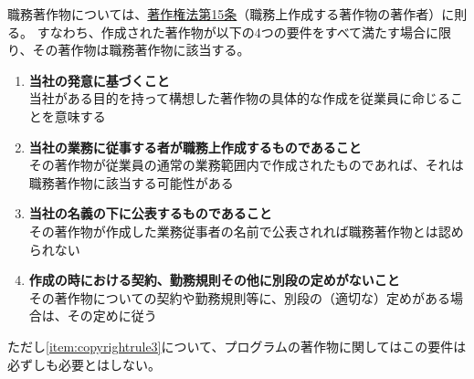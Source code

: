 職務著作物については、\href{https://elaws.e-gov.go.jp/document?lawid=345AC0000000048\#Mp-At_15}{著作権法第15条}（職務上作成する著作物の著作者）に則る。
すなわち、作成された著作物が以下の4つの要件をすべて満たす場合に限り、その著作物は職務著作物に該当する。
\begin{enumerate}[label=\Roman*., ref=\Roman*]
\item \textbf{当社の発意に基づくこと}\\
当社がある目的を持って構想した著作物の具体的な作成を従業員に命じることを意味する
\item \textbf{当社の業務に従事する者が職務上作成するものであること}\\
その著作物が従業員の通常の業務範囲内で作成されたものであれば、それは職務著作物に該当する可能性がある
\item\label{item:copyrightrule3} \textbf{当社の名義の下に公表するものであること}\\
その著作物が作成した業務従事者の名前で公表されれば職務著作物とは認められない
\item \textbf{作成の時における契約、勤務規則その他に別段の定めがないこと}\\
その著作物についての契約や勤務規則等に、別段の（適切な）定めがある場合は、その定めに従う
\end{enumerate}
ただし\ref{item:copyrightrule3}について、プログラムの著作物に関してはこの要件は必ずしも必要とはしない。



